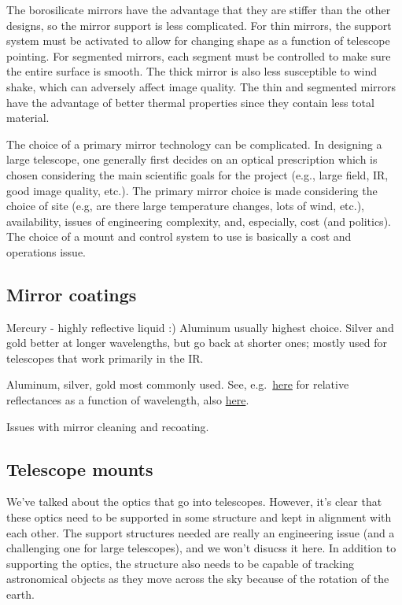 \documentclass[12pt]{article}
\newcommand{\mynotes}[1]{\textcolor{myBlue}{#1}}
\begin{document}
The borosilicate mirrors have the advantage that they are stiffer than the
other designs, so the mirror support is less complicated. For thin mirrors, the
support system must be activated to allow for changing shape as a function of
telescope pointing. For segmented mirrors, each segment must be controlled to
make sure the entire surface is smooth. The thick mirror is also less
susceptible to wind shake, which can adversely affect image quality. The thin
and segmented mirrors have the advantage of better thermal properties since
they contain less total material.

The choice of a primary mirror technology can be complicated. In designing a
large telescope, one generally first decides on an optical prescription which
is chosen considering the main scientific goals for the project (e.g., large
field, IR, good image quality, etc.). The primary mirror choice is made
considering the choice of site (e.g, are there large temperature changes, lots
of wind, etc.), availability, issues of engineering complexity, and,
especially, cost (and politics). The choice of a mount and control system to
use is basically a cost and operations issue.

\subsection{Mirror coatings}
\mynotes{Mercury - highly reflective liquid :) Aluminum usually highest choice.
Silver and gold better at longer wavelengths, but go back at shorter ones;
mostly used for telescopes that work primarily in the IR\@.}

Aluminum, silver, gold most commonly used. See, e.g.\ \href{http://www.optiforms.com/optical-coatings/}
{here} for relative reflectances as a function of wavelength, also \href{https://en.wikipedia.org/wiki/Reflectance}
{here}.

Issues with mirror cleaning and recoating.

\subsection{Telescope mounts}
We've talked about the optics that go into telescopes. However, it's clear that
these optics need to be supported in some structure and kept in alignment with
each other. The support structures needed are really an engineering issue (and
a challenging one for large telescopes), and we won't disucss it here. In
addition to supporting the optics, the structure also needs to be capable of
tracking astronomical objects as they move across the sky because of the
rotation of the earth.
\end{document}
